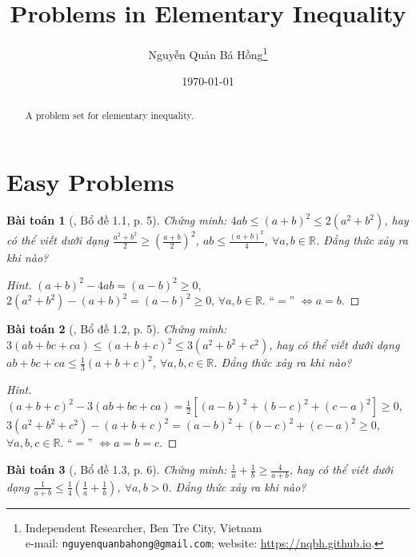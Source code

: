 \documentclass{article}
\title{Problems in Elementary Inequality}
\author{Nguyễn Quản Bá Hồng\footnote{Independent Researcher, Ben Tre City, Vietnam\\e-mail: \texttt{nguyenquanbahong@gmail.com}; website: \url{https://nqbh.github.io}.}}
\date{\today}
\newtheorem{baitoan}{Bài toán}
\begin{document}
\maketitle
\begin{abstract}
	A problem set for elementary inequality.
\end{abstract}
\tableofcontents
\newpage


\section{Easy Problems}

\begin{baitoan}[\cite{Son_Nghiep_Trung_Can2021}, Bổ đề 1.1, p. 5]
	Chứng minh: $4ab\le(a + b)^2\le2(a^2 + b^2)$, hay có thể viết dưới dạng $\frac{a^2 + b^2}{2}\ge\left(\frac{a + b}{2}\right)^2$, $ab\le\frac{(a + b)^2}{4}$, $\forall a,b\in\mathbb{R}$. Đẳng thức xảy ra khi nào?
\end{baitoan}

\begin{proof}[Hint]
	$(a + b)^2 - 4ab = (a - b)^2\ge 0$, $2(a^2 + b^2) - (a + b)^2 = (a - b)^2\ge 0$, $\forall a,b\in\mathbb{R}$. ``$=$'' $\Leftrightarrow a = b$.
\end{proof}

\begin{baitoan}[\cite{Son_Nghiep_Trung_Can2021}, Bổ đề 1.2, p. 5]
	Chứng minh: $3(ab + bc + ca)\le(a + b + c)^2\le3(a^2 + b^2 + c^2)$, hay có thể viết dưới dạng $ab + bc + ca\le\frac{1}{3}(a + b + c)^2$, $\forall a,b,c\in\mathbb{R}$. Đẳng thức xảy ra khi nào?
\end{baitoan}

\begin{proof}[Hint]
	$(a + b + c)^2 - 3(ab + bc + ca) = \frac{1}{2}\left[(a - b)^2 + (b - c)^2 + (c - a)^2\right]\ge 0$, $3(a^2 + b^2 + c^2) - (a + b + c)^2 = (a - b)^2 + (b - c)^2 + (c - a)^2\ge 0$, $\forall a,b,c\in\mathbb{R}$. ``$=$'' $\Leftrightarrow a = b = c$.
\end{proof}

\begin{baitoan}[\cite{Son_Nghiep_Trung_Can2021}, Bổ đề 1.3, p. 6]
	Chứng minh: $\frac{1}{a} + \frac{1}{b}\ge\frac{4}{a + b}$, hay có thể viết dưới dạng $\frac{1}{a + b}\le\frac{1}{4}\left(\frac{1}{a} + \frac{1}{b}\right)$, $\forall a,b > 0$. Đẳng thức xảy ra khi nào?
\end{baitoan}
\end{document}
